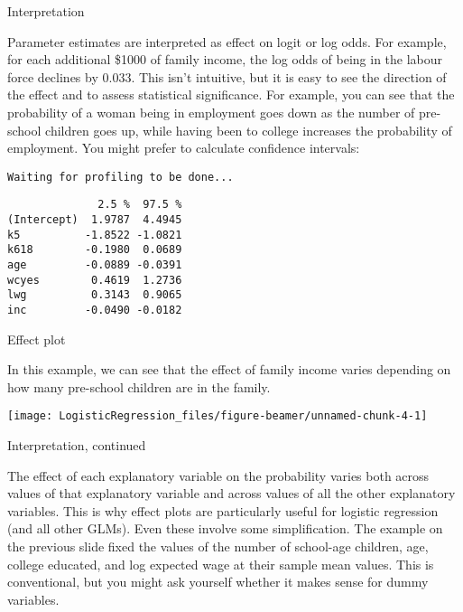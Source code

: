 \documentclass[10pt,ignorenonframetext,]{beamer}
\begin{document}
\begin{frame}[fragile]{Interpretation}

Parameter estimates are interpreted as effect on logit or log odds. For
example, for each additional \$1000 of family income, the log odds of
being in the labour force declines by 0.033. This isn't intuitive, but
it is easy to see the direction of the effect and to assess statistical
significance. For example, you can see that the probability of a woman
being in employment goes down as the number of pre-school children goes
up, while having been to college increases the probability of
employment. You might prefer to calculate confidence intervals:

\begin{verbatim}
Waiting for profiling to be done...
\end{verbatim}

\begin{verbatim}
              2.5 %  97.5 %
(Intercept)  1.9787  4.4945
k5          -1.8522 -1.0821
k618        -0.1980  0.0689
age         -0.0889 -0.0391
wcyes        0.4619  1.2736
lwg          0.3143  0.9065
inc         -0.0490 -0.0182
\end{verbatim}

\end{frame}

\begin{frame}{Effect plot}

In this example, we can see that the effect of family income varies
depending on how many pre-school children are in the family.

\begin{center}\texttt{[image: LogisticRegression\_files/figure-beamer/unnamed-chunk-4-1]} \end{center}

\end{frame}

\begin{frame}{Interpretation, continued}

The effect of each explanatory variable on the probability varies both
across values of that explanatory variable and across values of all the
other explanatory variables. This is why effect plots are particularly
useful for logistic regression (and all other GLMs). Even these involve
some simplification. The example on the previous slide fixed the values
of the number of school-age children, age, college educated, and log
expected wage at their sample mean values. This is conventional, but you
might ask yourself whether it makes sense for dummy variables.

\end{frame}
\end{document}
